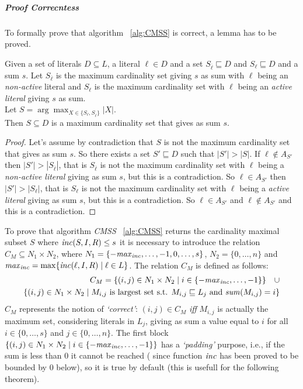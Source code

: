\subparagraph{Proof Correcntess}
To formally prove that algorithm ~\ref{alg:CMSS} is correct, a lemma 
has to be proved.
\begin{lemma}
    Given a set of literals $D \subseteq L$, a literal $\ell \in D$ and a set $S_{\overline{\ell}} \sqsubseteq D$
    and $S_{\ell} \sqsubseteq D$ and a sum $s$.
    Let $S_{\overline{\ell}}$ is the maximum cardinality set giving $s$ as sum with $\ell$ being an \textit{non-active} literal
    and $S_{\ell}$ is the maximum cardinality set with $\ell$ being an \textit{active literal} giving $s$  as sum.\\
    Let $ S = \arg\max_{X \in \{S_{\ell}, S_{\overline{\ell}}\}} |X| $. \\ 
    Then $S \subseteq D$ is a maximum cardinality set that gives as sum $s$.
    \label{lemma:cmin}
\end{lemma}

\begin{proof}
    Let's assume by contradiction that $S$ is not the maximum cardinality set that gives as sum $s$.
    So there exists a set $S' \sqsubseteq D$ such that $|S'| > |S|$.
    If $\ell \not\in A_{S'}$ then $|S'| > |S_{\overline{\ell}}|$, that is $S_{\overline{\ell}}$ 
    is not the maximum cardinality set 
    with $\ell$ being a \textit{non-active literal} giving as sum $s$, but this is a contradiction.
    So $\ell \in A_{S'}$ then $|S'| > |S_{\ell}|$, that is $S_{\ell}$ is not the maximum cardinality set 
    with $\ell$ being a \textit{active literal} giving as sum $s$, but this is a contradiction.
    So $\ell \in A_{S'}$ and $ \ell \not\in A_{S'}$ and this is a contradiction.
\end{proof}



To prove that algorithm \textit{CMSS} ~\ref{alg:CMSS} returns the cardinality maximal subset $S$ 
where  $\mathit{inc}(S,I,R) \le s$ it is necessary to introduce the
relation $C_M \subseteq N_1 \times N_2$, where $N_1 = \{-\mathit{max}_{\mathit{inc}}, \hdots, -1, 0, \hdots, s\}$,
$N_2 = \{0, \hdots, n\}$ and $\mathit{max}_{\mathit{inc}} = \max \{ \mathit{inc}(\ell,I,R) \mid \ell \in L\}$.
The relation $C_M$ is defined as follows:
\begin{align*}
    C_M = \{ (i,j) \in N_1 \times N_2 \mid i \in \{-\mathit{max}_{\mathit{inc}}, \hdots, -1\}\} \quad  \cup \\
    \{(i,j) \in N_1 \times N_2 \mid M_{i,j} \text{ is largest set s.t. } M_{i,j} \sqsubseteq L_j \text{ and } 
    \mathit{sum}(M_{i,j}) = i\}
\end{align*}
$C_M$ represents the notion of \textit{`correct'}: $(i,j) \in C_M$ \textit{iff}
$M_{i,j}$ is actually the maximum set, considering literals in $L_j$,
giving as sum a value equal to $i$ for all $i \in \{0, \hdots, s\}$
and $j \in \{0, \hdots, n\}$.
The first block $\{ (i,j) \in N_1 \times N_2 \mid i \in \{-\mathit{max}_{\mathit{inc}}, \hdots, -1\}\}$
has a \textit{`padding'} purpose, i.e., if the sum is less than 0 it cannot be reached ( since function $\mathit{inc}$
has been proved to be bounded by 0 below), so it is true by default (this is usefull for the following
theorem).

